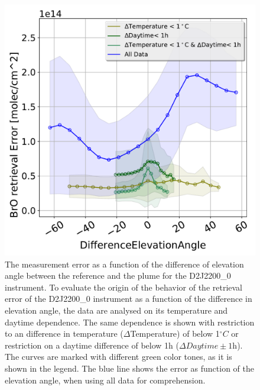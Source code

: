 \begin{figure}
	\centering
	\includegraphics[width=0.7\linewidth]{Bilder/DiffElevAngleKomischesInstr}
	\caption[The  measurement error as a function of the difference of elevation angle between the reference and the plume for the D2J2200\_0 instrument.]{The  measurement error as a function of the difference of elevation angle between the reference and the plume for the D2J2200\_0 instrument. To evaluate the origin of the behavior of the  retrieval error of the D2J2200\_0 instrument as a function of the difference in elevation angle, the data are analysed on its temperature and daytime dependence. The same dependence is shown with restriction to an difference in temperature ($\Delta$Temperature) of below 1$^{\circ}C$ or restriction on a daytime difference of below 1h ($\Delta Daytime \pm 1$h). The curves are marked with different green color tones, as it is shown in the legend. The blue line shows the  error as function of the elevation angle, when using all data for comprehension.}
	\label{fig:d2j22000diffelevangleonetempnevad}
\end{figure}


